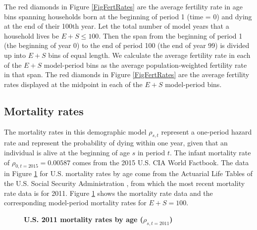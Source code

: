 \documentclass[letterpaper,12pt]{article}
\theoremstyle{definition}
\begin{document}
    The red diamonds in Figure \ref{FigFertRates} are the average fertility rate in age bins spanning households born at the beginning of period 1 (time = 0) and dying at the end of their 100th year. Let the total number of model years that a household lives be $E+S\leq 100$. Then the span from the beginning of period 1 (the beginning of year 0) to the end of period 100 (the end of year 99) is divided up into $E+S$ bins of equal length. We calculate the average fertility rate in each of the $E+S$ model-period bins as the average population-weighted fertility rate in that span. The red diamonds in Figure \ref{FigFertRates} are the average fertility rates displayed at the midpoint in each of the $E+S$ model-period bins.


  \subsection{Mortality rates}\label{SecMort}

    The mortality rates in this demographic model $\rho_{s,t}$ represent a one-period hazard rate and represent the probability of dying within one year, given that an individual is alive at the beginning of age $s$ in period $t$. The infant mortality rate of $\rho_{0,t=2015}=0.00587$ comes from the 2015 U.S. CIA World Factbook. The data in Figure \ref{FigMortRates} for U.S. mortality rates by age come from the Actuarial Life Tables of the U.S. Social Security Administration \citep[see][]{SocSec:2015}, from which the most recent mortality rate data is for 2011. Figure \ref{FigMortRates} shows the mortality rate data and the corresponding model-period mortality rates for $E+S=100$.

    \begin{figure}[htbp]\centering \captionsetup{width=4.0in}
      \caption{\label{FigMortRates}\textbf{U.S. 2011 mortality rates by age ($\rho_{s,t=2011}$)}}
    \end{figure}
\end{document}
